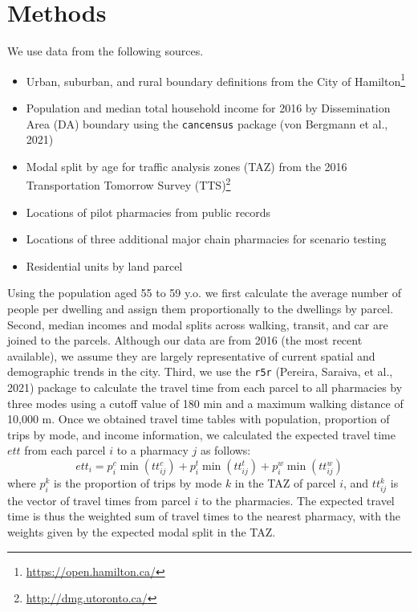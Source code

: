 \documentclass[]{elsarticle} %
\providecommand{\tightlist}{%
  \setlength{\itemsep}{0pt}\setlength{\parskip}{0pt}}
\begin{document}
\hypertarget{methods}{%
\section{Methods}\label{methods}}

We use data from the following sources.

\begin{itemize}
\tightlist
\item
  Urban, suburban, and rural boundary definitions from the City of
  Hamilton\footnote{\url{https://open.hamilton.ca/}}
\item
  Population and median total household income for 2016 by Dissemination
  Area (DA) boundary using the \texttt{cancensus} package (von Bergmann
  et al., 2021)
\item
  Modal split by age for traffic analysis zones (TAZ) from the 2016
  Transportation Tomorrow Survey
  (TTS)\footnote{\url{http://dmg.utoronto.ca/}}
\item
  Locations of pilot pharmacies from public records
\item
  Locations of three additional major chain pharmacies for scenario
  testing
\item
  Residential units by land parcel
\end{itemize}

Using the population aged 55 to 59 y.o. we first calculate the average
number of people per dwelling and assign them proportionally to the
dwellings by parcel. Second, median incomes and modal splits across
walking, transit, and car are joined to the parcels. Although our data
are from 2016 (the most recent available), we assume they are largely
representative of current spatial and demographic trends in the city.
Third, we use the \texttt{r5r} (Pereira, Saraiva, et al., 2021) package
to calculate the travel time from each parcel to all pharmacies by three
modes using a cutoff value of 180 min and a maximum walking distance of
10,000 m. Once we obtained travel time tables with population,
proportion of trips by mode, and income information, we calculated the
expected travel time \(ett\) from each parcel \(i\) to a pharmacy \(j\)
as follows: \[
ett_i = p^c_i \min(tt^c_{ij}) + p^t_i \min(tt^t_{ij}) + p^w_i \min(tt^w_{ij})
\] \noindent where \(p^k_i\) is the proportion of trips by mode \(k\) in
the TAZ of parcel \(i\), and \(tt^k_{ij}\) is the vector of travel times
from parcel \(i\) to the pharmacies. The expected travel time is thus
the weighted sum of travel times to the nearest pharmacy, with the
weights given by the expected modal split in the TAZ.
\end{document}

